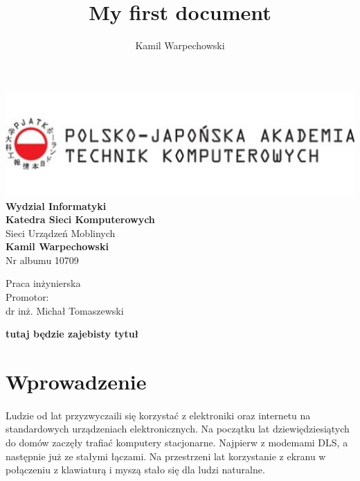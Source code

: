 \documentclass[12pt]{article}
\title{My first document}
\author{Kamil Warpechowski}
\begin{document}
\thispagestyle{firststyle}
\begin{center}
\includegraphics[width=1\textwidth]{images/logo.jpg}
\textbf{Wydzial Informatyki} \\
\vspace{3em}
\textbf{Katedra Sieci Komputerowych} \\
Sieci Urządzeń Moblinych \\
\vspace{3em}
\textbf{Kamil Warpechowski} \\
Nr albumu 10709
\end{center}


\vspace{3em}
{\addtolength{\leftskip}{70mm}

\noindent
Praca inżynierska
\\Promotor:
\\dr inż. Michał Tomaszewski

}

\vspace{3em}

\textbf {
	tutaj będzie zajebisty tytuł
}

\newpage
\tableofcontents
\newpage
  
\section{Wprowadzenie}
\paragraph{}
Ludzie od lat przyzwyczaili się korzystać z elektroniki oraz internetu na standardowych urządzeniach elektronicznych. Na początku lat dziewiędziesiątych do domów zaczęły trafiać komputery stacjonarne. Najpierw z modemami DLS, a następnie już ze stałymi łączami. Na przestrzeni lat korzystanie z ekranu w połączeniu z klawiaturą i myszą stało się dla ludzi naturalne.
\end{document}
